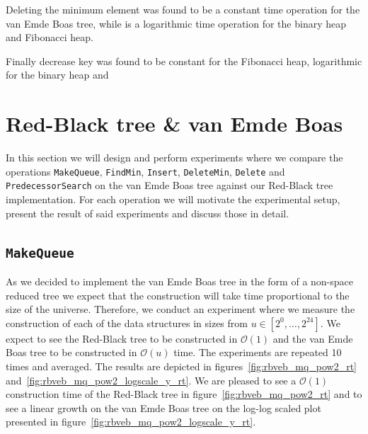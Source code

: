 \documentclass[a4paper,oneside,article,11pt]{memoir}
\begin{document}
Deleting the minimum element was found to be a constant time operation for the van Emde Boas tree, while is a logarithmic time operation for the binary heap and Fibonacci heap.

Finally decrease key was found to be constant for the Fibonacci heap, logarithmic for the binary heap and %

\chapter{Red-Black tree \& van Emde Boas}
\label{chap:treee}

In this section we will design and perform experiments where we compare the operations \texttt{MakeQueue}, \texttt{FindMin}, \texttt{Insert}, \texttt{DeleteMin}, \texttt{Delete} and \texttt{PredecessorSearch} on the van Emde Boas tree against our Red-Black tree implementation. For each operation we will motivate the experimental setup, present the result of said experiments and discuss those in detail.

\section{\texttt{MakeQueue}}
As we decided to implement the van Emde Boas tree in the form of a non-space reduced tree we expect that the construction will take time proportional to the size of the universe. Therefore, we conduct an experiment where we measure the construction of each of the data structures in sizes from $u \in [2^0, \dots, 2^{24}]$. We expect to see the Red-Black tree to be constructed in $\mathcal{O}(1)$ and the van Emde Boas tree to be constructed in $\mathcal{O}(u)$ time. The experiments are repeated 10 times and averaged. The results are depicted in figures~\ref{fig:rbveb_mq_pow2_rt} and~\ref{fig:rbveb_mq_pow2_logscale_y_rt}. We are pleased to see a $\mathcal{O}(1)$ construction time of the Red-Black tree in figure~\ref{fig:rbveb_mq_pow2_rt} and to see a linear growth on the van Emde Boas tree on the log-log scaled plot presented in figure~\ref{fig:rbveb_mq_pow2_logscale_y_rt}.
\end{document}
